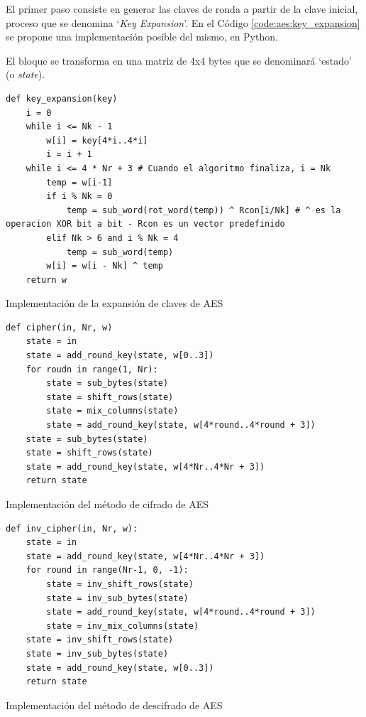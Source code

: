 \documentclass[11pt]{article}
\begin{document}
El primer paso consiste en generar las claves de ronda a partir de la clave inicial, proceso que se denomina `\textit{Key Expansion}'. En el Código \ref{code:aes:key_expansion} se propone una implementación posible del mismo, en Python.

El bloque se transforma en una matriz de 4x4 bytes que se denominará `estado' (o \textit{state}). 

\begin{listing}[h]
\begin{verbatim}
def key_expansion(key)
    i = 0
    while i <= Nk - 1
        w[i] = key[4*i..4*i]
        i = i + 1
    while i <= 4 * Nr + 3 # Cuando el algoritmo finaliza, i = Nk
        temp = w[i-1]
        if i % Nk = 0
            temp = sub_word(rot_word(temp)) ^ Rcon[i/Nk] # ^ es la operacion XOR bit a bit - Rcon es un vector predefinido
        elif Nk > 6 and i % Nk = 4
            temp = sub_word(temp)
        w[i] = w[i - Nk] ^ temp
    return w
\end{verbatim}
\caption{Implementación de la expansión de claves de AES}
\label{code:aes:key_expansion}
\end{listing}

\begin{listing}[h]
\begin{verbatim}
def cipher(in, Nr, w)
    state = in
    state = add_round_key(state, w[0..3])
    for roudn in range(1, Nr):
        state = sub_bytes(state)
        state = shift_rows(state)
        state = mix_columns(state)
        state = add_round_key(state, w[4*round..4*round + 3])
    state = sub_bytes(state)
    state = shift_rows(state)
    state = add_round_key(state, w[4*Nr..4*Nr + 3])
    return state
\end{verbatim}
\caption{Implementación del método de cifrado de AES}
\end{listing}

\begin{listing}[h]
\begin{verbatim}
def inv_cipher(in, Nr, w):
    state = in
    state = add_round_key(state, w[4*Nr..4*Nr + 3])
    for round in range(Nr-1, 0, -1):
        state = inv_shift_rows(state)
        state = inv_sub_bytes(state)
        state = add_round_key(state, w[4*round..4*round + 3])
        state = inv_mix_columns(state)
    state = inv_shift_rows(state)
    state = inv_sub_bytes(state)
    state = add_round_key(state, w[0..3])
    return state
\end{verbatim}
\caption{Implementación del método de descifrado de AES}
\label{code:aes:inv_cipher}
\end{listing}
\end{document}
